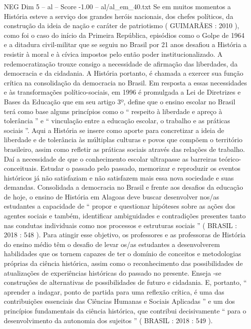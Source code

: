 \begin{textsample}{NEG Dim 5 – al – Score -1.00 – al/al\_em\_40.txt}
Se em muitos momentos a História esteve a serviço dos grandes heróis nacionais, dos chefes políticos, da construção da ideia de nação e caráter de patriotismo ( GUIMARÃES : 2010 ), como foi o caso do início da Primeira República, episódios como o Golpe de 1964 e a ditadura civil-militar que se seguiu no Brasil por 21 anos desafiou a História a resistir à moral e à cívica impostos pelo então poder institucionalizado.
A redemocratização trouxe consigo a necessidade de afirmação das liberdades, da democracia e da cidadania.
A História portanto, é chamada a exercer sua função crítica na consolidação da democracia no Brasil.
Em resposta a essas necessidades e às transformações político-sociais, em 1996 é promulgada a Lei de Diretrizes e Bases da Educação que em seu artigo 3º, define que o ensino escolar no Brasil terá como base alguns princípios como o “ respeito à liberdade e apreço à tolerância ” e “ vinculação entre a educação escolar, o trabalho e as práticas sociais ”.
Aqui a História se insere como aporte para concretizar a ideia de liberdade e de tolerância às múltiplas culturas e povos que compõem o território brasileiro, assim como refletir as práticas sociais através das relações de trabalho.
Daí a necessidade de que o conhecimento escolar ultrapasse as barreiras teórico-conceituais.
Estudar o passado pelo passado, memorizar e reproduzir os eventos históricos já não satisfaziam e não satisfazem mais essa nova sociedade e suas demandas.
Consolidada a democracia no Brasil e frente aos desafios da educação de hoje, o ensino de História em Alagoas deve buscar desenvolver nos/as estudantes a capacidade de “ propor e questionar hipóteses sobre as ações dos agentes sociais e também, identificar ambiguidades e contradições presentes tanto nas condutas individuais como nos processos e estruturas sociais ” ( BRASIL : 2018 : 548 ).
Para atingir esse objetivo, os professores e as professoras de História do ensino médio têm o desafio de levar os/as estudantes a desenvolverem habilidades que os tornem capazes de ter o domínio de conceitos e metodologias próprias da ciência histórica, assim como o reconhecimento das possibilidades de atualizações de experiências históricas do passado no presente.
Enseja -se construções de alternativas de possibilidades de futuro e cidadania.
E, portanto, “ aprender a indagar, ponto de partida para uma reflexão crítica, é uma das contribuições essenciais das Ciências Humanas e Sociais Aplicadas ” e um dos princípios fundamentais da ciência histórica, que contribui decisivamente “ para o desenvolvimento da autonomia dos sujeitos ” ( BRASIL : 2018 : 549 ).

\end{textsample}
